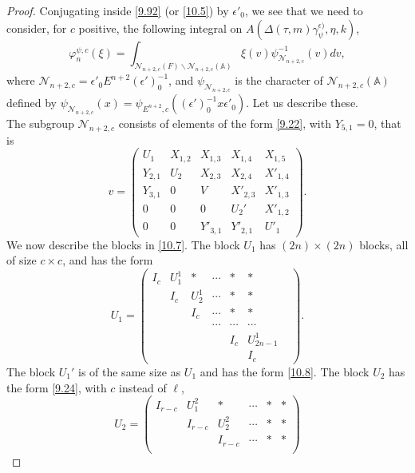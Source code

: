 \documentclass[12pts]{amsart}
\newcommand{\BA}{{\mathbb {A}}}
\begin{document}
\begin{proof}
Conjugating inside \eqref{9.92} (or \eqref{10.5}) by $\epsilon'_0$, we see that we need to consider, for $c$ positive, the following integral on $A(\Delta(\tau,m)\gamma_\psi^{\epsilon)},\eta,k)$,
\begin{equation}\label{10.6}
\varphi_n^{\psi,c}(\xi)=
\int_{\mathcal{N}_{n+2,c}(F)\backslash
	\mathcal{N}_{n+2,c}(\BA)}\xi(v)\psi^{-1}_{\mathcal{N}_{n+2,c}}(v)dv, 
\end{equation}
where $\mathcal{N}_{n+2,c}=\epsilon'_0E^{n+2}(\epsilon')_0^{-1}$, and $\psi_{\mathcal{N}_{n+2,c}}$ is the character of $\mathcal{N}_{n+2,c}(\BA)$ defined by $\psi_{\mathcal{N}_{n+2,c}}(x)=\psi_{E^{n+2},c}((\epsilon')_0^{-1}x\epsilon'_0)$. Let us describe these.\\ 
The subgroup $\mathcal{N}_{n+2,c}$ consists of elements of the form \eqref{9.22}, with $Y_{5,1}=0$, that is
\begin{equation}\label{10.7}
v=\begin{pmatrix}U_1&X_{1,2}&X_{1,3}&X_{1,4}&X_{1,5}\\Y_{2,1}&U_2&X_{2,3}&X_{2,4}&X'_{1,4}\\
Y_{3,1}&0&V&X'_{2,3}&X'_{1,3}\\0&0&0&U_2'&X'_{1,2}\\0&0&Y'_{3,1}&Y'_{2,1}&U'_1\end{pmatrix}.
\end{equation}
We now describe the blocks in \eqref{10.7}. The block $U_1$ has $(2n)\times (2n)$ blocks, all of size $c\times c$, and has the form
\begin{equation}\label{10.8}
U_1=\begin{pmatrix}I_c&U^1_1&*&\cdots&*&*\\
&I_c&U^1_2&\cdots&*&*\\
& &I_c&\cdots &* & * \\
& & & \cdots& \cdots&\cdots &\\
& & &       &I_c&U^1_{2n-1}\\
& & &       & &I_c\end{pmatrix}.
\end{equation}
The block $U_1'$ is of the same size as $U_1$ and has the form
\eqref{10.8}. The block $U_2$ has the form \eqref{9.24}, with $c$ instead of $\ell$, 
\begin{equation}\label{10.9}
U_2=\begin{pmatrix}I_{r-c}&U^2_1&*&\cdots&*&*\\
&I_{r-c}&U^2_2&\cdots&*&*\\
& &I_{r-c}&\cdots &* & * \\

\end{pmatrix}
\end{equation}
\end{proof}
\end{document}
